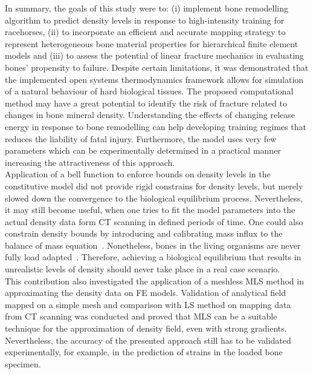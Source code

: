 \documentclass[11pt]{acmeArticle}
\numberwithin{equation}{section}
\begin{document}
In summary, the goals of this study were to: (i) implement bone remodelling algorithm to predict density levels in response to high-intensity training for racehorses, (ii) to incorporate an efficient and accurate mapping strategy to represent heterogeneous bone material properties for hierarchical finite element models and (iii) to assess the potential of linear fracture mechanics in evaluating bones' propensity to failure. 
Despite certain limitations, it was demonstrated that the implemented open systems thermodynamics framework allows for simulation of a natural behaviour of hard biological tissues. 
The proposed computational method may have a great potential to identify the risk of fracture related to changes in bone mineral density. 
Understanding the effects of changing release energy in response to bone remodelling can help developing training regimes that reduces the liability of fatal injury. 
Furthermore, the model uses very few parameters which can be experimentally determined in a practical manner increasing the attractiveness of this approach.\\ 

Application of a bell function to enforce bounds on density levels in the constitutive model did not provide rigid constrains for density levels, but merely slowed down the convergence to the biological equilibrium process. 
Nevertheless, it may still become useful, when one tries to fit the model parameters into the actual density data form CT scanning in defined periods of time. 
One could also constrain density bounds by introducing and calibrating mass influx to the balance of mass equation~\citep{sharma2013adaptive}. 
Nonetheless, bones in the living organisms are never fully load adapted~\citep{christen2014bone}. 
Therefore, achieving a biological equilibrium that results in unrealistic levels of density should never take place in a real case scenario. \\

This contribution also investigated the application of a meshless MLS method in approximating the density data on FE models. Validation of analytical field mapped on a simple mesh and comparison with LS method on mapping data from CT scanning was conducted and proved that MLS can be a suitable technique for the approximation of density field, even with strong gradients. 
Nevertheless, the accuracy of the presented approach still has to be validated experimentally, for example, in the prediction of strains in the loaded bone specimen.  \\
\end{document}
